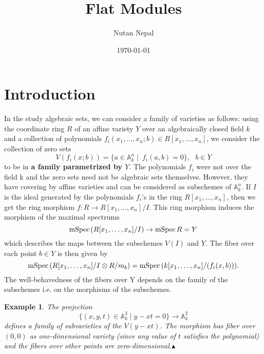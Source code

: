 \documentclass[12pt]{article}
\title{Flat Modules}
\author{Nutan Nepal}
\date{\today}
\theoremstyle{mytheoremstyle}
\newtheorem{example}{Example}
\newcommand{\bA}{\mathbb{A}}
\newcommand{\mspec}{\text{mSpec\hspace*{.5mm}}}
\begin{document}
\maketitle

\makebox[\linewidth]{\rule{200mm}{1pt}}
\section{Introduction}
\hspace*{8mm}In the study algebraic sets, we can consider a family of varieties as
follows: using the coordinate ring $R$ of an
affine variety $Y$ over an algebraically closed field $k$ and a collection
of polynomials $f_i(x_1,\ldots,x_n; b)\in R[x_1,\ldots,x_n]$, we consider
the collection of zero sets
$$V(f_i(x;b))=\{a\in \mathbb{A}^n_k\mid \ f_i(a,b)=0\},\ \ \ b\in Y$$ to be
in \textbf{a family parametrized by $Y$}. The polynomials $f_i$ were not over the
field k and the zero sets need not be algebraic sets themselves. However,
they have covering by affine varieties and can be considered
as subschemes of $\bA^n_k$.
If $I$ is the ideal generated by the polynomials $f_i$'s
in the ring $R[x_1,\ldots,x_n]$,
then we get the ring morphism $f\colon R\to R[x_1,\ldots,x_n]/I$.
This ring morphism induces the morphism of the maximal spectrums
$$\mspec (R[x_1,\ldots,x_n]/I) \to \mspec R = Y$$
which describes the maps between the subschemes $V(I)$ and $Y$.
The fiber over each point $b\in Y$ is then given by
$$\mspec (R[x_1,\ldots,x_n]/I\otimes R/m_b)=\mspec (k[x_1,\ldots,x_n]
/(f_i(x,b))).$$
The well-behavedness of the fibers over Y depends on the family of
the subschemes i.e. on the morphisms of the subschemes.
\begin{example}
    The projection
    $$\{(x,y,t)\in \bA^3_k\mid y-xt=0\}\to \bA^2_k$$
    defines a family of subvarieties of the $V(y-xt)$.
    The morphism has fiber over $(0,0)$ as one-dimensional variety
    (since any value of $t$
    satisfies the polynomial) and the fibers over other points are
    zero-dimensional.$\blacktriangle$
\end{example}

\end{document}
